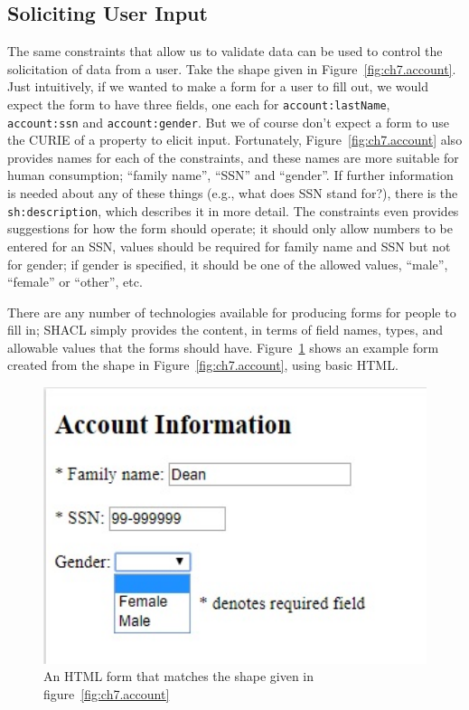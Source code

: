 \subsection{Soliciting User Input}\label{soliciting}

The same constraints that allow us to validate data can be used to
control the solicitation of data from a user.  Take the shape given in
Figure~\ref{fig:ch7.account}.  Just intuitively, if we wanted to make
a form for a user to fill out, we would expect the form to have three
fields, one each for \texttt{account:lastName}, \texttt{account:ssn}
and \texttt{account:gender}.  But we of course don't expect a form to
use the CURIE of a property to elicit input.  Fortunately,
Figure~\ref{fig:ch7.account} also provides names for each of the
constraints, and these names are more suitable for human consumption;
``family name'', ``SSN'' and ``gender''.  If further information is
needed about any of these things (e.g., what does SSN stand for?),
there is the \texttt{sh:description}, which describes it in more
detail.  The constraints even
provides suggestions for how the form should operate; it should only 
allow numbers to be entered for an SSN, values should be required for family name
and SSN but not for gender; if gender is specified, it  should be one of the allowed values, 
``male'', ``female'' or ``other'', etc. 

There are any number of technologies available for producing forms for
people to fill in; SHACL simply provides the content, in terms of
field names, types, and allowable values that the forms should have.
Figure~\ref{fig:ch7.form} shows an example form created from the shape
in Figure~\ref{fig:ch7.account}, using basic HTML.

\begin{figure}
    \centering
    \includegraphics[width=5in]{SWWOv3/media/ch7/figure-07-form.jpg}
    \caption{An HTML form that matches the shape given in figure~\protect\ref{fig:ch7.account}}
    \label{fig:ch7.form}
\end{figure}

